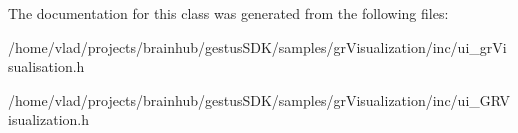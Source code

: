 The documentation for this class was generated from the following files\+:\begin{DoxyCompactItemize}
\item 
/home/vlad/projects/brainhub/gestus\+S\+D\+K/samples/gr\+Visualization/inc/ui\+\_\+gr\+Visualisation.\+h\item 
/home/vlad/projects/brainhub/gestus\+S\+D\+K/samples/gr\+Visualization/inc/ui\+\_\+\+G\+R\+Visualization.\+h\end{DoxyCompactItemize}
